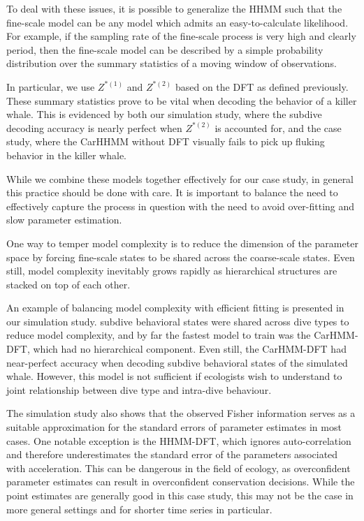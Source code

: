 To deal with these issues, it is possible to generalize the HHMM such that the fine-scale model can be any model which admits an easy-to-calculate likelihood. For example, if the sampling rate of the fine-scale process is very high and clearly period, then the fine-scale model can be described by a simple probability distribution over the summary statistics of a moving window of observations. 

In particular, we use $Z^{*(1)}$ and $Z^{*(2)}$ based on the DFT as defined previously. These summary statistics prove to be vital when decoding the behavior of a killer whale. This is evidenced by both our simulation study, where the subdive decoding accuracy is nearly perfect when $Z^{*(2)}$ is accounted for, and the case study, where the CarHHMM without DFT visually fails to pick up fluking behavior in the killer whale.

While we combine these models together effectively for our case study, in general this practice should be done with care. It is important to balance the need to effectively capture the process in question with the need to avoid over-fitting and slow parameter estimation.

One way to temper model complexity is to reduce the dimension of the parameter space by forcing fine-scale states to be shared across the coarse-scale states. Even still, model complexity inevitably grows rapidly as hierarchical structures are stacked on top of each other.

An example of balancing model complexity with efficient fitting is presented in our simulation study. subdive behavioral states were shared across dive types to reduce model complexity, and by far the fastest model to train was the CarHMM-DFT, which had no hierarchical component. Even still, the CarHMM-DFT had near-perfect accuracy when decoding subdive behavioral states of the simulated whale.
However, this model is not sufficient if ecologists wish to understand to joint relationship between dive type and intra-dive behaviour. 

The simulation study also shows that the observed Fisher information serves as a suitable approximation for the standard errors of parameter estimates in most cases. One notable exception is the HHMM-DFT, which ignores auto-correlation and therefore underestimates the standard error of the parameters associated with acceleration. This can be dangerous in the field of ecology, as overconfident parameter estimates can result in overconfident conservation decisions. While the point estimates are generally good in this case study, this may not be the case in more general settings and for shorter time series in particular.

